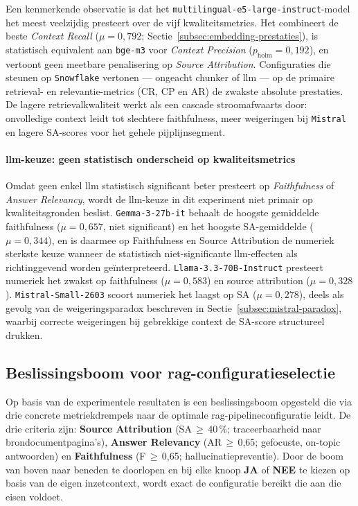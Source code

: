 Een kenmerkende observatie is dat het \texttt{multilingual-e5-large-instruct}-model het meest veelzijdig presteert over de vijf kwaliteitsmetrics. Het combineert de beste \textit{Context Recall} ($\mu = 0{,}792$; Sectie~\ref{subsec:embedding-prestaties}), is statistisch equivalent aan \texttt{bge-m3} voor \textit{Context Precision} ($p_{\text{holm}} = 0{,}192$), en vertoont geen meetbare penalisering op \textit{Source Attribution}. Configuraties die steunen op \texttt{Snowflake} vertonen — ongeacht chunker of \gls{llm} — op de primaire retrieval- en relevantie-metrics (CR, CP en AR) de zwakste absolute prestaties. De lagere retrievalkwaliteit werkt als een cascade stroomafwaarts door: onvolledige context leidt tot slechtere faithfulness, meer weigeringen bij \texttt{Mistral} en lagere SA-scores voor het gehele pijplijnsegment.

\paragraph{\gls{llm}-keuze: geen statistisch onderscheid op kwaliteitsmetrics}

Omdat geen enkel \gls{llm} statistisch significant beter presteert op \textit{Faithfulness} of \textit{Answer Relevancy}, wordt de \gls{llm}-keuze in dit experiment niet primair op kwaliteitsgronden beslist. \texttt{Gemma-3-27b-it} behaalt de hoogste gemiddelde faithfulness ($\mu = 0{,}657$, niet significant) en het hoogste SA-gemiddelde ($\mu = 0{,}344$), en is daarmee op Faithfulness en Source Attribution de numeriek sterkste keuze wanneer de statistisch niet-significante \gls{llm}-effecten als richtinggevend worden geïnterpreteerd. \texttt{Llama-3.3-70B-Instruct} presteert numeriek het zwakst op faithfulness ($\mu = 0{,}583$) en source attribution ($\mu = 0{,}328$). \texttt{Mistral-Small-2603} scoort numeriek het laagst op SA ($\mu = 0{,}278$), deels als gevolg van de weigeringsparadox beschreven in Sectie~\ref{subsec:mistral-paradox}, waarbij correcte weigeringen bij gebrekkige context de SA-score structureel drukken.

\subsection{Beslissingsboom voor \gls{rag}-configuratieselectie}
\label{subsec:beslisboom}

Op basis van de experimentele resultaten is een beslissingsboom opgesteld die via drie concrete metriekdrempels naar de optimale \gls{rag}-pipelineconfiguratie leidt. De drie criteria zijn: \textbf{Source Attribution} (SA\,$\geq$\,40\,\%; traceerbaarheid naar brondocumentpagina's), \textbf{Answer Relevancy} (AR\,$\geq$\,0{,}65; gefocuste, on-topic antwoorden) en \textbf{Faithfulness} (F\,$\geq$\,0{,}65; hallucinatiepreventie). Door de boom van boven naar beneden te doorlopen en bij elke knoop \textbf{JA} of \textbf{NEE} te kiezen op basis van de eigen inzetcontext, wordt exact de configuratie bereikt die aan die eisen voldoet.

